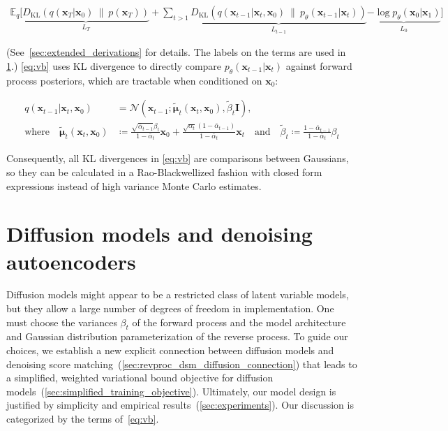 \begin{align}
\mathbb{E}_q \bigg[ \underbrace{D_{\mathrm{KL}}\!\left(q(\mathbf{x}_T|\mathbf{x}_0) ~ \| ~ p(\mathbf{x}_T)\right)}_{L_T} + \sum_{t > 1} \underbrace{D_{\mathrm{KL}}\!\left(q(\mathbf{x}_{t-1}|\mathbf{x}_t,\mathbf{x}_0) ~ \| ~ p_\theta(\mathbf{x}_{t-1}|\mathbf{x}_t)\right)}_{L_{t-1}} \underbrace{-\log p_\theta(\mathbf{x}_0|\mathbf{x}_1)}_{L_0} \bigg] \label{eq:vb}
\end{align}

(See~\ref{sec:extended_derivations} for details. The labels on the terms are used in \ref{sec:main}.) \ref{eq:vb} uses KL divergence to directly compare $p_\theta(\mathbf{x}_{t-1}|\mathbf{x}_t)$ against forward process posteriors, which are tractable when conditioned on $\mathbf{x}_0$:

\begin{align}
q(\mathbf{x}_{t-1}|\mathbf{x}_t,\mathbf{x}_0) &=  \mathcal{N}(\mathbf{x}_{t-1}; \tilde{\boldsymbol{\mu}}_t(\mathbf{x}_t, \mathbf{x}_0), \tilde\beta_t \mathbf{I}), \\
\text{where}\quad \tilde{\boldsymbol{\mu}}_t(\mathbf{x}_t, \mathbf{x}_0) &\coloneqq \frac{\sqrt{\bar\alpha_{t-1}}\beta_t }{1-\bar\alpha_t}\mathbf{x}_0 + \frac{\sqrt{\alpha_t}(1- \bar\alpha_{t-1})}{1-\bar\alpha_t} \mathbf{x}_t \quad \text{and} \quad
\tilde\beta_t \coloneqq \frac{1-\bar\alpha_{t-1}}{1-\bar\alpha_t}\beta_t  \label{eq:q_posterior_mean_var}
\end{align}

Consequently, all KL divergences in \ref{eq:vb} are comparisons between Gaussians, so they can be calculated in a Rao-Blackwellized fashion with closed form expressions instead of high variance Monte Carlo estimates.

\section{Diffusion models and denoising autoencoders}
\label{sec:main}

Diffusion models might appear to be a restricted class of latent variable models, but they allow a large number of degrees of freedom in implementation. One must choose the variances $\beta_t$ of the forward process and the model architecture and Gaussian distribution parameterization of the reverse process. To guide our choices, we establish a new explicit connection between diffusion models and denoising score matching~(\ref{sec:revproc_dsm_diffusion_connection}) that leads to a simplified, weighted variational bound objective for diffusion models~(\ref{sec:simplified_training_objective}). Ultimately, our model design is justified by simplicity and empirical results~(\ref{sec:experiments}). Our discussion is categorized by the terms of~\ref{eq:vb}.


